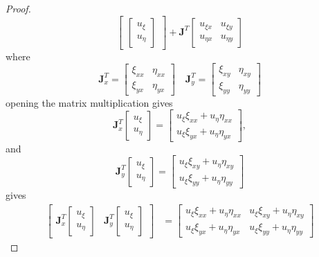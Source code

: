 \documentclass[a4]{overview}
\begin{document}
\begin{proof}
\[\begin{bmatrix}
		\begin{bmatrix} u_{\xi}\\ u_{\eta} \end{bmatrix}
		\end{bmatrix}
		+
		\boldsymbol{J}^T
		\begin{bmatrix} u_{\xi x} & u_{\xi y}\\ u_{\eta x} & u_{\eta y} \end{bmatrix}
	\] 
	where \[
		\boldsymbol{J}^T_x = \begin{bmatrix} \xi_{xx} & \eta_{xx}\\ \xi_{yx} & \eta_{yx} \end{bmatrix}
		\quad
		\boldsymbol{J}^T_y = \begin{bmatrix} \xi_{xy} & \eta_{xy}\\ \xi_{yy} & \eta_{yy} \end{bmatrix}
	\] 
	opening the matrix multiplication gives
	\[
	\boldsymbol{J}^T_x
	\begin{bmatrix}
	u_\xi\\
	u_\eta
	\end{bmatrix}
	=
	\begin{bmatrix}
	u_\xi \xi_{xx} + u_\eta \eta_{xx}\\
	u_\xi \xi_{yx} + u_\eta \eta_{yx}
	\end{bmatrix},
	\]
	and
	\[
	\boldsymbol{J}^T_y
	\begin{bmatrix}
	u_\xi\\
	u_\eta
	\end{bmatrix}
	=
	\begin{bmatrix}
	u_\xi \xi_{xy} + u_\eta \eta_{xy}\\
	u_\xi \xi_{yy} + u_\eta \eta_{yy}
	\end{bmatrix}
\]
gives
\[
\begin{aligned}
\begin{bmatrix}
\boldsymbol{J}^T_x \begin{bmatrix} u_\xi\\ u_\eta \end{bmatrix}
&
\boldsymbol{J}^T_y \begin{bmatrix} u_\xi\\ u_\eta \end{bmatrix}
\end{bmatrix}
&=
\begin{bmatrix}
u_\xi \xi_{xx} + u_\eta \eta_{xx}
&
u_\xi \xi_{xy} + u_\eta \eta_{xy}
\\
u_\xi \xi_{yx} + u_\eta \eta_{yx}
&
u_\xi \xi_{yy} + u_\eta \eta_{yy}
\end{bmatrix}

\end{aligned}\]
\end{proof}
\end{document}
